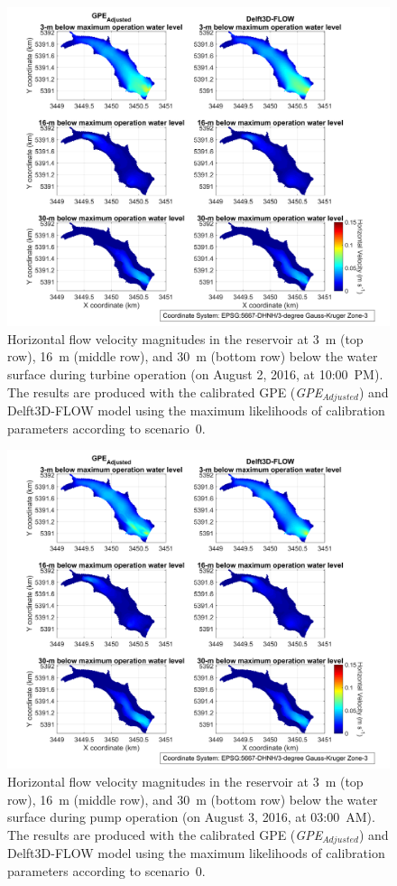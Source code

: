 \documentclass[draft,linenumbers,onecolumn]{agujournal2019} %
\begin{document}
\begin{figure}
	\centering
	\includegraphics[width=16cm]{turbine.png}
	\caption{Horizontal flow velocity magnitudes in the reservoir at 3~m (top row), 16~m (middle row), and 30~m (bottom row) below the water surface during turbine operation (on August 2, 2016, at 10:00~PM). The results are produced with the calibrated GPE (\textit{GPE$_{Adjusted}$}) and Delft3D-FLOW model using the maximum likelihoods of calibration parameters according to scenario~0.}
	\label{fig07:turbine}
\end{figure}

\begin{figure}
	\centering
	\includegraphics[width=16cm]{pumping.png}
	\caption{Horizontal flow velocity magnitudes in the reservoir at 3~m (top row), 16~m (middle row), and 30~m (bottom row) below the water surface during pump operation (on August 3, 2016, at 03:00~AM). The results are produced with the calibrated GPE (\textit{GPE$_{Adjusted}$}) and Delft3D-FLOW model using the maximum likelihoods of calibration parameters according to scenario~0.}
	\label{fig08:pump}
\end{figure}
\end{document}
